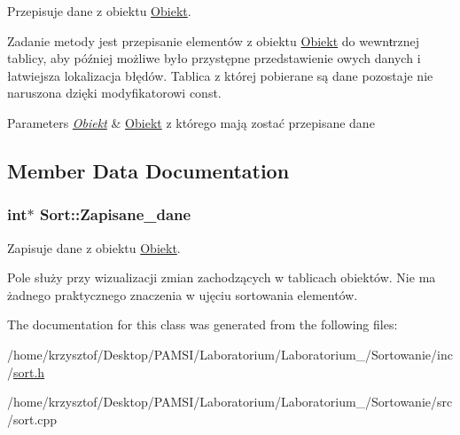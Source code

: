 \-Przepisuje dane z obiektu \hyperlink{class_obiekt}{\-Obiekt}. 

\-Zadanie metody jest przepisanie elementów z obiektu \hyperlink{class_obiekt}{\-Obiekt} do wewnŧrznej tablicy, aby później możliwe było przystępne przedstawienie owych danych i łatwiejsza lokalizacja błędów. \-Tablica z której pobierane są dane pozostaje nie naruszona dzięki modyfikatorowi const.


\begin{DoxyParams}{\-Parameters}
{\em \hyperlink{class_obiekt}{\-Obiekt}} & \hyperlink{class_obiekt}{\-Obiekt} z którego mają zostać przepisane dane \\
\hline
\end{DoxyParams}


\subsection{\-Member \-Data \-Documentation}
\hypertarget{class_sort_a6cb891a8e545fdb636d10bec406fef32}{
\subsubsection[{\-Zapisane\-\_\-dane}]{\setlength{\rightskip}{0pt plus 5cm}int$\ast$ {\bf \-Sort\-::\-Zapisane\-\_\-dane}}}\label{class_sort_a6cb891a8e545fdb636d10bec406fef32}


\-Zapisuje dane z obiektu \hyperlink{class_obiekt}{\-Obiekt}. 

\-Pole służy przy wizualizacji zmian zachodzących w tablicach obiektów. \-Nie ma żadnego praktycznego znaczenia w ujęciu sortowania elementów. 

\-The documentation for this class was generated from the following files\-:\begin{DoxyCompactItemize}
\item 
/home/krzysztof/\-Desktop/\-P\-A\-M\-S\-I/\-Laboratorium/\-Laboratorium\-\_/\-Sortowanie/inc/\hyperlink{sort_8h}{sort.\-h}\item 
/home/krzysztof/\-Desktop/\-P\-A\-M\-S\-I/\-Laboratorium/\-Laboratorium\-\_/\-Sortowanie/src/sort.\-cpp\end{DoxyCompactItemize}
